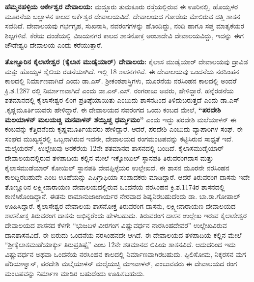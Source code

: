 \textbf{ಹೆಮ್ಮನಹಳ್ಳಿಯ ಅರ್ಕೇಶ್ವರ ದೇವಾಲಯ:} ಮದ್ದೂರು ತುಮಕೂರು ರಸ್ತೆಯಲ್ಲಿರುವ ಈ ಊರಿನಲ್ಲಿ, ಹೊಯ್ಸಳರ ಮೂರನೆಯ ಬಲ್ಲಾಳನ ಕಾಲದ ಅರ್ಕೆಶ್ವರ ದೇವಾಲಯವಿದೆ. ದೇವಾಲಯದ ಗೋಡೆಯ ಮೇಲಿರುವ ದತ್ತಿ ಶಾಸನ ಸವೆದಿದೆ. ದೇವಾಲಯವು ಗರ್ಭಗೃಹ, ಸುಖನಾಸಿ, ನವರಂಗಗಳನ್ನು ಹೊಂದಿದ್ದು, ನಂದಿ ಹಾಗೂ ಸಪ್ತ ಮಾತೃಕೆಯರ ಶಿಲ್ಪಗಳಿವೆ. ಕೆರೆಯ ದಂಡೆಯಲ್ಲಿ ವಿಜಯನಗರ ಕಾಲದ ಶಾಸನೋಕ್ತ ಅಂಬಾದೇವಿ ದೇವಾಲಯವಿದ್ದು, ಇದನ್ನು ಈಗ ಚೌಡೇಶ್ವರಿ ದೇವಾಲಯ ಎಂದು ಕರೆಯುತ್ತಾರೆ.

\textbf{ತೊಣ್ಣೂರಿನ ಕೈಲಾಸೇಶ್ವರ (ಕೈಲಾಸ ಮುಡೈಯಾರ್​) ದೇವಾಲಯ:} ಕೈಲಾಸ ಮುಡೈಯಾರ್​ ದೇವಾಲಯವು ದ್ರಾವಿಡ ಮತ್ತು ಹೊಯ್ಸಳ ಶೈಲಿಯ ರಚನೆಯಾಗಿದೆ. ಇಲ್ಲಿ 18 ಶಾಸನಗಳಿವೆ. ಈ ದೇವಾಲಯವು ಒಂದನೆಯ ನರಸಿಂಹನ ಕಾಲದಲ್ಲಿ ನಿರ್ಮಾಣವಾಗಿದೆ ಎಂದು ಡಾ.ಎಸ್​. ಶ‍್ರೀಕಂಠಶಾಸ್ತ್ರಿಗಳು, ಮೂರನೆಯ ನರಸಿಂಹನ ಕಾಲದಲ್ಲಿ ಅಂದರೆ ಕ್ರಿ.ಶ.1287 ರಲ್ಲಿ ನಿರ್ಮಾಣವಾಗಿದೆ ಎಂದು ಡಾ.ಎನ್​.ಎಸ್​. ರಂಗರಾಜು ಅವರು, ಹೇಳಿದ್ದಾರೆ. ಹನ್ನೆರಡನೆಯ ಶತಮಾನದಲ್ಲಿ ಕೈಲಾಸೇಶ್ವರ ಲಿಂಗ ಪ್ರತಿಷ್ಠೆಯಾಯಿತು ಎಂಬುದು ಶಾಸನದಿಂದ ತಿಳಿದುಬರುತ್ತದೆ ಎಂದು ಡಾ.ಎಸ್​.ಕೃಷ್ಣಮೂರ್ತಿಯವರು ಹೇಳಿದ್ದಾರೆ. ಈ ದೇವಾಲಯದ ನವರಂಗದ ಒಂದು ಕಂಬದ ಮೇಲೆ, \textbf{“ಪರದೇಶಿ ಮಲಯಾಳನ್​ ಮಲಯಚ್ಚಿ ಮನವಾಳನ್​ ಶೆಯ್ವಿಚ್ಚ ಧರ್ಮ್ಮಮಂ”} ಎಂದು ಇದ್ದು ಪರದೇಶಿ ಮಲೆಯಾಳನ್​ ಈ ಕಂಬವನ್ನು ಕೆತ್ತಿದನೆಂದು ಕೃಷ್ಣಮೂರ್ತಿಯವರು ಹೇಳಿದ್ದಾರೆ. ಆದರೆ, ಪರದೇಶಿ ಎಂಬುದು ವ್ಯಾಪಾರಿಗಳ ಸಂಘ. ಈ ಸಂಘದ ಮುಖ್ಯಸ್ಥರಲ್ಲಿ ಒಬ್ಬನಾಗಿರುವ ಇವನೇ, ದೇವಾಲಯದ ರಂಗಮಂಟಪವನ್ನು ಕಟ್ಟಿಸಿರುವ ಸಾಧ್ಯತೆ ಇದೆ. ಮಲೈಯರನ್​, ಉಲ್ಲೇಖವು ಅರಕೆರೆಯ 12ನೇ ಶತಮಾನದ ಶಾಸನದಲ್ಲಿ ಬಂದಿದೆ. ಕೈಲಾಸಮುಡೈಯಾರ್​ ದೇವಾಲಯದಲ್ಲಿರುವ ತಳಪಾದಿಯ ಕಲ್ಲಿನ ಮೇಲೆ ಇಕ್ಕೋಯಿಲ್​ ಸ್ಥಾನಪತಿ ತಿರುವರಂಗದಾಸ ಮತ್ತು ಕೈಲಾಸಮುಡೆಯಾರ್​ ಕೋಯಿಲ್​ ಸ್ಥಾನಪತಿ ದೇವಪ್ಪಿಳ್ಳೆಯರ ಉಲ್ಲೇಖದೆ. ಈ ಶಾಸನ ಮೂರನೇ ನರಸಿಂಹನ ಕಾಲದ್ದಿರಬಹುದೇ ಎಂಬ ಊಹೆಯನ್ನು ಎಪಿಗ್ರಾಫಿಯಾ ಸಂಪಾದಕರು ಮಾಡಿದ್ದಾರೆ. ಆದರೆ ತಿರುವರಂಗ ದಾಸನು ಇದೇ ತೊಣ್ಣೂರಿನ ಲಕ್ಷ್ಮೀನಾರಾಯಣ ದೇವಾಲಯದಲ್ಲಿರುವ ಒಂದನೆಯ ನರಸಿಂಹನ ಕ್ರಿ.ಶ.1174ರ ಶಾಸನದಲ್ಲಿ ಕಾಣಿಸಿಕೊಂಡಿದ್ದಾನೆ. ಈತನು ರಾಮಾನುಜಾಚಾರ್ಯರ ನೇರವಾದ ಶಿಷ್ಯನಿರಬಹು\-ದೆಂದು ಡಾ. ಬಾ.ರಾ.ಗೋಪಾಲ್​ ಊಹಿಸಿದ್ದಾರೆ. ಕೈಲಾಸೇಶ್ವರ ದೇವಾಲಯ ಶಾಸನೋಕ್ತ ತಿರುವರಂಗ ದಾಸನು, ಲಕ್ಷ್ಮೀನಾರಾಯಣ ದೇವಾಲಯದ ಶಾಸನೋಕ್ತ ತಿರುವರಂಗ ದಾಸನು ಅಭಿನ್ನರೆಂದು ಹೇಳಬಹುದು. ತಿರುವರಂಗ ದಾಸನ ಉಲ್ಲೇಖ ಇರುವ ಕೈಲಾಸೇಶ್ವರ ದೇವಾಲಯದ ಶಾಸನದ ಕೆಳಗೇ “ಭುಜಬಳ ವೀರಗಂಗ ವಿಷ್ಣುವರ್ಧನ ನಾರಸಿಂಹದೇವರ” ಉಲ್ಲೇಖವಿರುವ ದಾನಶಾಸನವಿದೆ. ಈ ಬಿರುದು ಒಂದನೆಯ ನರಸಿಂಹನದೇ ಆಗಿದೆ. ಈ ದೇವಾಲಯದ ತಳಪಾದಿಯ ಕಲ್ಲಿನ ಮೇಲೆ “ಶ‍್ರೀಕೈಲಾಸಮುಡೆಯಾರ್ಕ್ಕು ತಿರುಪ್ರತಿಷ್ಠೈ” ಎಂಬ 12ನೇ ಶತಮಾನದ ಲಿಪಿಯ ಶಾಸನವಿದೆ. ಆದುದರಿಂದ ಇದು ವಿಷ್ಣುವರ್ಧನ ಅಥವಾ ಒಂದನೆಯ ನರಸಿಂಹನ ಕಾಲದಲ್ಲಿ ನಿರ್ಮಾಣವಾಗಿರಬಹುದು. ಪ್ಪಿಲಿಸೋಮ, ನಿಕ್ಕರಸನ ಮಗ ಪೆರಿಯಾಳ್ವಾನ್,​ ಪರದೇಶಿ ಮಲೈಯಾಳನ್​ ಮಲೈಯಚ್ಚಿ ಮಣವಾಳನ್​, ಎಂಬುವವರು ಈ ದೇವಾಲಯದ ರಂಗ ಮಂಟಪವನ್ನು ನಿರ್ಮಾಣ ಮಾಡಿರ ಬಹುದೆಂದು ಊಹಿಸಬಹುದು. 